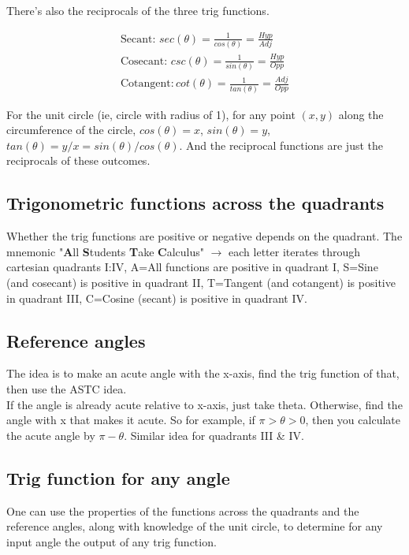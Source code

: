 \documentclass{article}
\begin{document}
There's also the reciprocals of the three trig functions. 

\begin{align*}
    \text{Secant: } sec(\theta) = \frac{1}{cos(\theta)} = \frac{Hyp}{Adj}\\
    \text{Cosecant: } csc(\theta) = \frac{1}{sin(\theta)} = \frac{Hyp}{Opp}\\
    \text{Cotangent}: cot(\theta) = \frac{1}{tan(\theta)} = \frac{Adj}{Opp}
\end{align*}

For the unit circle (ie, circle with radius of 1), for any point $(x, y)$ along the
circumference of the circle, $cos(\theta)=x$, $sin(\theta) = y$, $tan(\theta) = y/x =
sin(\theta) / cos(\theta)$. And the reciprocal functions are just the reciprocals of these
outcomes.

\subsection{Trigonometric functions across the quadrants}

Whether the trig functions are positive or negative depends on the quadrant. The mnemonic
"\textbf{A}ll \textbf{S}tudents \textbf{T}ake \textbf{C}alculus" $\rightarrow$ each letter
iterates through cartesian quadrants I:IV, A=All functions are positive in quadrant I,
S=Sine (and cosecant) is positive in quadrant II, T=Tangent (and cotangent) is positive in
quadrant III, C=Cosine (secant) is positive in quadrant IV. 


\subsection{Reference angles}

The idea is to make an acute angle with the x-axis, find the trig function of that, then
use the ASTC idea.\\

If the angle is already acute relative to x-axis, just take theta. Otherwise, find the
angle with x that makes it acute. So for example, if $\pi > \theta > 0$, then you
calculate the acute angle by $\pi - \theta$. Similar idea for quadrants III \& IV.

\subsection{Trig function for any angle}

One can use the properties of the functions across the quadrants and the reference angles,
along with knowledge of the unit circle, to determine for any input angle the output of
any trig function.\\
\end{document}
